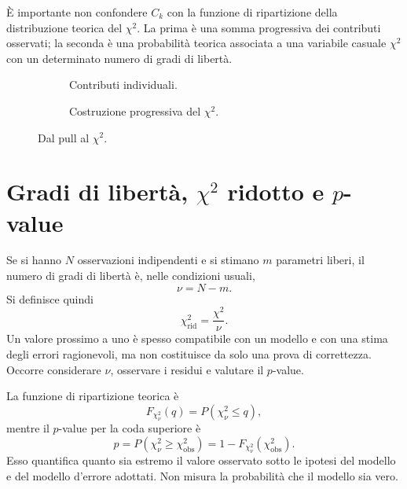 \documentclass[11pt,a4paper]{book}
\begin{document}
È importante non confondere $C_k$ con la funzione di ripartizione della distribuzione teorica del $\chi^2$. La prima è una somma progressiva dei contributi osservati; la seconda è una probabilità teorica associata a una variabile casuale $\chi^2$ con un determinato numero di gradi di libertà.

\begin{figure}[htbp]
  \centering
  \begin{subfigure}{0.48\textwidth}
    \centering
    \caption{Contributi individuali.}
  \end{subfigure}
  \hfill
  \begin{subfigure}{0.48\textwidth}
    \centering
    \caption{Costruzione progressiva del $\chi^2$.}
  \end{subfigure}
  \caption{Dal pull al $\chi^2$.}
  \label{fig:chi2build}
\end{figure}

\section{Gradi di libertà, $\chi^2$ ridotto e $p$-value}
Se si hanno $N$ osservazioni indipendenti e si stimano $m$ parametri liberi, il numero di gradi di libertà è, nelle condizioni usuali,
\begin{equation}
 \nu=N-m.
\end{equation}
Si definisce quindi
\begin{equation}
 \chi^2_{\mathrm{rid}}=\frac{\chi^2}{\nu}.
\end{equation}
Un valore prossimo a uno è spesso compatibile con un modello e con una stima degli errori ragionevoli, ma non costituisce da solo una prova di correttezza. Occorre considerare $\nu$, osservare i residui e valutare il $p$-value.

La funzione di ripartizione teorica è
\begin{equation}
 F_{\chi^2_\nu}(q)=P(\chi^2_\nu\le q),
\end{equation}
mentre il $p$-value per la coda superiore è
\begin{equation}
 p=P(\chi^2_\nu\ge\chi^2_{\mathrm{obs}})
 =1-F_{\chi^2_\nu}(\chi^2_{\mathrm{obs}}).
\end{equation}
Esso quantifica quanto sia estremo il valore osservato sotto le ipotesi del modello e del modello d'errore adottati. Non misura la probabilità che il modello sia vero.
\end{document}
